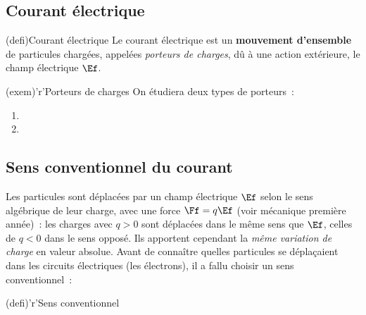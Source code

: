 \documentclass[../../main/main.tex]{subfiles}
\begin{document}
\subsection{Courant électrique}
\begin{tcbraster}[raster columns=2, raster equal height=rows]
	\begin{tcb}[label=def:courant](defi){Courant électrique}
		Le courant électrique est un \textbf{mouvement d'ensemble} de particules
		chargées, appelées \textit{porteurs de charges}, dû à une action
		extérieure, le champ électrique $\Ef$.
	\end{tcb}
	\begin{tcb}[label=exem:porteurs](exem)'r'{Porteurs de charges}
		On étudiera deux types de porteurs~:
		\begin{enumerate}
			\item {}
			\item {}
		\end{enumerate}
	\end{tcb}
\end{tcbraster}

\subsection{Sens conventionnel du courant}

\begin{tcbraster}[raster columns=3, raster equal height=rows]
	\begin{tcolorbox}[blankest, raster multicolumn=2, valign=center]
		Les particules sont déplacées par un champ électrique $\Ef$ selon le sens
		algébrique de leur charge, avec une force $\Ff = q\Ef$ (voir mécanique
		première année)~: les charges avec $q>0$ sont déplacées dans le même sens
		que $\Ef$, celles de $q<0$ dans le sens opposé. Ils apportent cependant la
		\textit{même variation de charge} en valeur absolue. Avant de connaître
		quelles particules se déplaçaient dans les circuits électriques (les
		électrons), il a fallu choisir un sens conventionnel~:
	\end{tcolorbox}
	\begin{tcb}[label=def:sensconv](defi)'r'{Sens conventionnel}
	\end{tcb}
\end{tcbraster}
\end{document}
